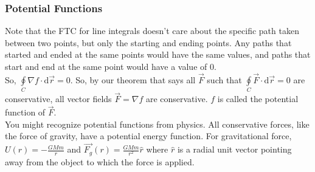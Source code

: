 \subsubsection{Potential Functions}
\noindent
Note that the FTC for line integrals doesn't care about the specific path taken between two points, but only the starting and ending points. Any paths that started and ended at the same points would have the same values, and paths that start and end at the same point would have a value of 0.\\
So, $\oint\limits_{C}{\nabla f \cdot \mathrm{d}\vec{r}} = 0$. So, by our theorem that says all $\vec{F}$ such that $\oint\limits_{C}{\vec{F} \cdot \mathrm{d}\vec{r}} = 0$ are conservative, all vector fields $\vec{F} = \nabla f$ are conservative. $f$ is called the potential function of $\vec{F}$.\\

\noindent
You might recognize potential functions from physics. All conservative forces, like the force of gravity, have a potential energy function. For gravitational force, $U(r) = -\frac{GMm}{r}$ and $\vec{F_g}(r) = \frac{GMm}{r^2}\hat{r}$ where $\hat{r}$ is a radial unit vector pointing away from the object to which the force is applied.